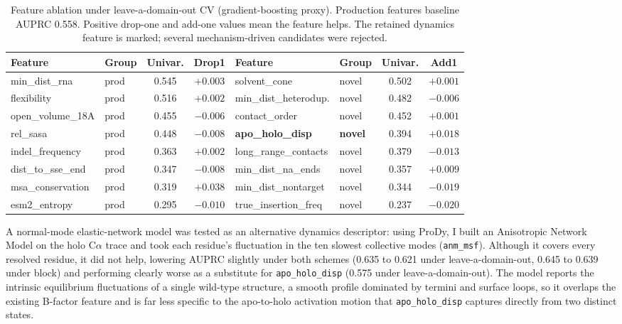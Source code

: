 \documentclass[10pt]{article}
\begin{document}
\begin{table}[h]
\centering
\caption{Feature ablation under leave-a-domain-out CV (gradient-boosting proxy). Production
features baseline AUPRC 0.558. Positive drop-one and add-one values mean the feature helps. The
retained dynamics feature is marked; several mechanism-driven candidates were rejected.}
\label{tab:ablation}
\scriptsize
\begin{tabular}{llcc@{\hskip 1.1em}llcc}
\toprule
Feature & Group & Univar. & Drop1 & Feature & Group & Univar. & Add1 \\
\midrule
min\_dist\_rna     & prod & 0.545 & $+0.003$ & solvent\_cone        & novel & 0.502 & $+0.001$ \\
flexibility        & prod & 0.516 & $+0.002$ & min\_dist\_heterodup. & novel & 0.482 & $-0.006$ \\
open\_volume\_18A  & prod & 0.455 & $-0.006$ & contact\_order       & novel & 0.452 & $+0.001$ \\
rel\_sasa          & prod & 0.448 & $-0.008$ & \textbf{apo\_holo\_disp} & \textbf{novel} & 0.394 & $\mathbf{+0.018}$ \\
indel\_frequency   & prod & 0.363 & $+0.002$ & long\_range\_contacts & novel & 0.379 & $-0.013$ \\
dist\_to\_sse\_end & prod & 0.347 & $-0.008$ & min\_dist\_na\_ends   & novel & 0.357 & $+0.009$ \\
msa\_conservation  & prod & 0.319 & $\mathbf{+0.038}$ & min\_dist\_nontarget & novel & 0.344 & $-0.019$ \\
esm2\_entropy      & prod & 0.295 & $-0.010$ & true\_insertion\_freq & novel & 0.237 & $-0.020$ \\
\bottomrule
\end{tabular}
\end{table}

A normal-mode elastic-network model was tested as an alternative dynamics descriptor: using ProDy,
I built an Anisotropic Network Model on the holo C$\alpha$ trace and took each residue's
fluctuation in the ten slowest collective modes (\texttt{anm\_msf}). Although it covers every
resolved residue, it did not help, lowering AUPRC slightly under both schemes (0.635 to 0.621 under
leave-a-domain-out, 0.645 to 0.639 under block) and performing clearly worse as a substitute for
\texttt{apo\_holo\_disp} (0.575 under leave-a-domain-out). The model reports the intrinsic
equilibrium fluctuations of a single wild-type structure, a smooth profile dominated by termini and
surface loops, so it overlaps the existing B-factor feature and is far less specific to the
apo-to-holo activation motion that \texttt{apo\_holo\_disp} captures directly from two distinct
states.
\end{document}
